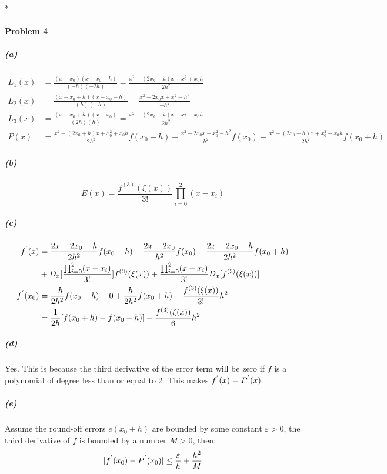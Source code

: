 *\documentclass{article}
\begin{document}
\newpage
\paragraph{Problem 4}
\subparagraph{(a)}
\begin{equation}\nonumber
\begin{split}
L_1(x)&=\frac{(x-x_0)(x-x_0-h)}{(-h)(-2h)} = \frac{x^2-(2x_0+h)x+x_0^2+x_0h}{2h^2} \\
L_2(x)&=\frac{(x-x_0+h)(x-x_0-h)}{(h)(-h)} = \frac{x^2-2x_0x+x_0^2-h^2}{-h^2} \\
L_3(x)&=\frac{(x-x_0+h)(x-x_0)}{(2h)(h)} = \frac{x^2-(2x_0-h)x+x_0^2-x_0h}{2h^2} \\
P(x)&=\frac{x^2-(2x_0+h)x+x_0^2+x_0h}{2h^2}f(x_0-h)-\frac{x^2-2x_0x+x_0^2-h^2}{h^2}f(x_0)+\frac{x^2-(2x_0-h)x+x_0^2-x_0h}{2h^2}f(x_0+h)
\end{split}
\end{equation}

\subparagraph{(b)}
$$E(x)=\frac{f^{(3)}(\xi(x))}{3!}\prod_{i=0}^{2} (x-x_i)$$

\subparagraph{(c)}
\begin{equation}\nonumber
\begin{split}
f^{\rq}(x)&=\frac{2x-2x_0-h}{2h^2}f(x_0-h)-\frac{2x-2x_0}{h^2}f(x_0) + \frac{2x-2x_0+h}{2h^2}f(x_0+h)\\&+D_x[\frac{\prod_{i=0}^{2} (x-x_i)}{3!}]f^{(3)}(\xi(x))+\frac{\prod_{i=0}^{2} (x-x_i)}{3!}D_x[f^{(3)}(\xi(x))]\\
f^{\rq}(x_0)&=\frac{-h}{2h^2}f(x_0-h)-0+\frac{h}{2h^2}f(x_0+h)-\frac{f^{(3)}(\xi(x))}{3!}h^2 \\
&= \frac{1}{2h}[f(x_0+h)-f(x_0-h)]-\frac{f^{(3)}(\xi(x))}{6}h^2
\end{split}
\end{equation}

\subparagraph{(d)}
Yes. This is because the third derivative of the error term will be zero if $f$ is a polynomial of degree less than or equal to 2. This makes $f^{\rq}(x)=P^{\rq}(x)$.

\subparagraph{(e)}
Assume the round-off errors $e(x_0\pm h)$ are bounded by some constant $\varepsilon>0$, the third derivative of $f$ is bounded by a number $M>0$, then:
$$|f^{\rq}(x_0)-P^{\rq}(x_0)| \leq \frac{\varepsilon}{h}+\frac{h^2}{M}$$
\end{document}
